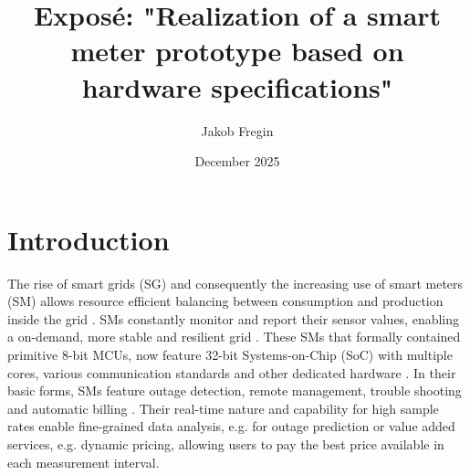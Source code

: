 \documentclass[english]{tudscrartcl}
\begin{document}
	\title{Exposé: "Realization of a smart meter prototype based on hardware specifications"}
	\author{Jakob Fregin}
	\date{December 2025}

  	\maketitle
	\section{Introduction}
	\normalsize
	The rise of smart grids (SG) and consequently the increasing use of smart meters (SM) allows resource efficient balancing between consumption and production inside the grid \cite{en15196984}.
	SMs constantly monitor and report their sensor values, enabling a on-demand, more stable and resilient grid \cite{en15196984}.
	These SMs that formally contained primitive 8-bit MCUs, now feature 32-bit Systems-on-Chip (SoC) with multiple cores, various communication standards and other dedicated hardware \cite{ARTICLE:3}.
	In their basic forms, SMs feature outage detection, remote management, trouble shooting and automatic billing \cite{7379940}.
	Their real-time nature and capability for high sample rates enable fine-grained data analysis, e.g. for outage prediction \cite{8646486}
	or value added services, e.g. dynamic pricing, allowing users to pay the best price available in each measurement interval.
	
\end{document}
